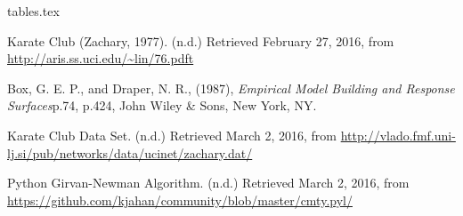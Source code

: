 \documentclass{article}
\begin{document}
{tables.tex}
\newpage
\begin{thebibliography}{9}
%
Karate Club (Zachary, 1977). (n.d.) Retrieved February 27, 2016, from \url{http://aris.ss.uci.edu/~lin/76.pdft}

Box, G. E. P., and Draper, N. R., (1987), \textit{Empirical Model Building and Response Surfaces}p.74, p.424, John Wiley \& Sons, New York, NY.

Karate Club Data Set. (n.d.) Retrieved March 2, 2016, from \url{http://vlado.fmf.uni-lj.si/pub/networks/data/ucinet/zachary.dat/}

Python Girvan-Newman Algorithm. (n.d.) Retrieved March 2, 2016, from \url{https://github.com/kjahan/community/blob/master/cmty.pyl/}
\end{thebibliography}
\end{document}
